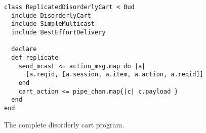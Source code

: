 \begin{figure}[h!]
\begin{scriptsize}
\begin{lstlisting}
class ReplicatedDisorderlyCart < Bud
  include DisorderlyCart
  include SimpleMulticast
  include BestEffortDelivery

  declare
  def replicate
    send_mcast <= action_msg.map do |a| 
      [a.reqid, [a.session, a.item, a.action, a.reqid]] 
    end
    cart_action <= pipe_chan.map{|c| c.payload }
  end
end
\end{lstlisting}
\centering
\vspace{-10pt}
\caption{The complete disorderly cart program.}
\label{fig:complete-dis-cart}
\end{scriptsize}
\vspace{-2pt}
\end{figure}